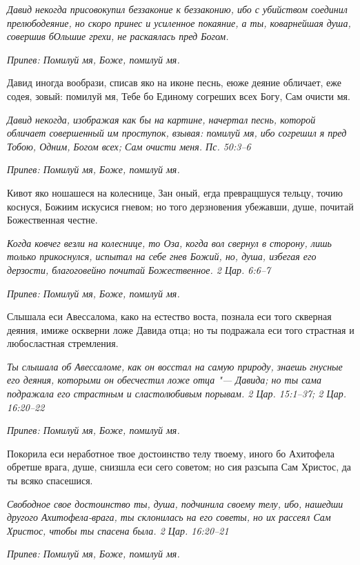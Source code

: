 \itshape Давид некогда присовокупил беззаконие к беззаконию, ибо с убийством соединил прелюбодеяние, но скоро принес и усиленное покаяние, а ты, коварнейшая душа, совершив бОльшие грехи, не раскаялась пред Богом.\normalfont{}


\itshape Припев:\normalfont{} Помилуй мя, Боже, помилуй мя.


Давид иногда вообрази, списав яко на иконе песнь, еюже деяние обличает, еже содея, зовый: помилуй мя, Тебе бо Единому согреших всех Богу, Сам очисти мя.


\itshape Давид некогда, изображая как бы на картине, начертал песнь, которой обличает совершенный им проступок, взывая: помилуй мя, ибо согрешил я пред Тобою, Одним, Богом всех; Сам очисти меня. Пс. 50:3–6\normalfont{}


\itshape Припев:\normalfont{} Помилуй мя, Боже, помилуй мя.


Кивот яко ношашеся на колеснице, Зан оный, егда превращшуся тельцу, точию коснуся, Божиим искусися гневом; но того дерзновения убежавши, душе, почитай Божественная честне.


\itshape Когда ковчег везли на колеснице, то Оза, когда вол свернул в сторону, лишь только прикоснулся, испытал на себе гнев Божий, но, душа, избегая его дерзости, благоговейно почитай Божественное. 2 Цар. 6:6–7\normalfont{}


\itshape Припев:\normalfont{} Помилуй мя, Боже, помилуй мя.


Слышала еси Авессалома, како на естество воста, познала еси того скверная деяния, имиже оскверни ложе Давида отца; но ты подражала еси того страстная и любосластная стремления.


\itshape Ты слышала об Авессаломе, как он восстал на самую природу, знаешь гнусные его деяния, которыми он обесчестил ложе отца "--- Давида; но ты сама подражала его страстным и сластолюбивым порывам. 2 Цар. 15:1–37; 2 Цар. 16:20–22\normalfont{}


\itshape Припев:\normalfont{} Помилуй мя, Боже, помилуй мя.


Покорила еси неработное твое достоинство телу твоему, иного бо Ахитофела обретше врага, душе, снизшла еси сего советом; но сия разсыпа Сам Христос, да ты всяко спасешися.


\itshape Свободное свое достоинство ты, душа, подчинила своему телу, ибо, нашедши другого Ахитофела-врага, ты склонилась на его советы, но их рассеял Сам Христос, чтобы ты спасена была. 2 Цар. 16:20–21\normalfont{}


\itshape Припев:\normalfont{} Помилуй мя, Боже, помилуй мя.


